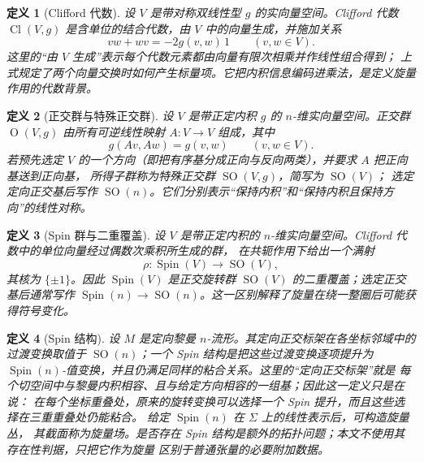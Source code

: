 \documentclass[UTF8,fontset=none,a4paper,11pt]{ctexart}
\theoremstyle{foundation-definition}
\newtheorem{definition}{定义}[section]
\theoremstyle{foundation-theorem}
\theoremstyle{foundation-proposition}
\theoremstyle{foundation-example}
\theoremstyle{foundation-remark}
\theoremstyle{foundation-theorem}
\begin{document}
\begin{definition}[Clifford 代数]\label{def:clifford-algebra}
设 \(V\) 是带对称双线性型 \(g\) 的实向量空间。Clifford 代数
\(\operatorname{Cl}(V,g)\) 是含单位的结合代数，由 \(V\) 中的向量生成，并施加关系
\[
vw+wv=-2g(v,w)\,1\qquad(v,w\in V).
\]
这里的“由 \(V\) 生成”表示每个代数元素都由向量有限次相乘并作线性组合得到；
上式规定了两个向量交换时如何产生标量项。它把内积信息编码进乘法，是定义旋量作用的代数背景。
\end{definition}

\begin{definition}[正交群与特殊正交群]\label{def:orthogonal-special-orthogonal}
设 \(V\) 是带正定内积 \(g\) 的 \(n\)-维实向量空间。正交群
\(\operatorname{O}(V,g)\) 由所有可逆线性映射 \(A:V\to V\) 组成，其中
\[
g(Av,Aw)=g(v,w)\qquad(v,w\in V).
\]
若预先选定 \(V\) 的一个方向（即把有序基分成正向与反向两类），并要求 \(A\) 把正向基送到正向基，
所得子群称为特殊正交群 \(\operatorname{SO}(V,g)\)，简写为 \(\operatorname{SO}(V)\)；
选定定向正交基后写作 \(\operatorname{SO}(n)\)。它们分别表示“保持内积”和“保持内积且保持方向”的线性对称。
\end{definition}

\begin{definition}[Spin 群与二重覆盖]\label{def:spin-group}
设 \(V\) 是带正定内积的 \(n\)-维实向量空间。Clifford 代数中的单位向量经过偶数次乘积所生成的群，
在共轭作用下给出一个满射
\[
\rho:\operatorname{Spin}(V)\longrightarrow \operatorname{SO}(V),
\]
其核为 \(\{\pm1\}\)。因此 \(\operatorname{Spin}(V)\) 是正交旋转群
\(\operatorname{SO}(V)\) 的二重覆盖；选定正交基后通常写作
\(\operatorname{Spin}(n)\to\operatorname{SO}(n)\)。这一区别解释了旋量在绕一整圈后可能获得符号变化。
\end{definition}

\begin{definition}[Spin 结构]\label{def:spin-structure}
设 \(M\) 是定向黎曼 \(n\)-流形。其定向正交标架在各坐标邻域中的过渡变换取值于
\(\operatorname{SO}(n)\)；一个 Spin 结构是把这些过渡变换逐项提升为
\(\operatorname{Spin}(n)\)-值变换，并且仍满足同样的粘合关系。这里的“定向正交标架”就是
每个切空间中与黎曼内积相容、且与给定方向相容的一组基；因此这一定义只是在说：
在每个坐标重叠处，原来的旋转变换可以选择一个 Spin 提升，而且这些选择在三重重叠处仍能粘合。
给定 \(\operatorname{Spin}(n)\) 在 \(\Sigma\) 上的线性表示后，可构造旋量丛，
其截面称为旋量场。是否存在 Spin 结构是额外的拓扑问题；本文不使用其存在性判据，只把它作为旋量
区别于普通张量的必要附加数据。
\end{definition}
\end{document}
